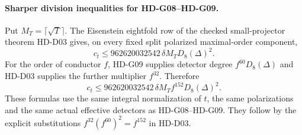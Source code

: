 \paragraph{Sharper division inequalities for HD-G08--HD-G09.}
Put $M_T=\lceil\sqrt T\rceil$. The Eisenstein eightfold row of
the checked small-projector theorem HD-D03 gives, on every fixed
split polarized maximal-order component,
\[
\boxed{c_t\le962620032542\,\delta M_T D_8(\Delta)^2.}
\]
For the order of conductor $f$, HD-G09 supplies detector degree
$f^{60}D_8(\Delta)$ and HD-D03 supplies the further multiplier
$f^{32}$. Therefore
\[
\boxed{c_t\le962620032542\,\delta M_T
f^{152}D_8(\Delta)^2.}
\]
These formulas use the same integral normalization of $t$, the same
polarizations and the same actual effective detectors as HD-G08--HD-G09.
They follow by the explicit substitutions
$f^{32}(f^{60})^2=f^{152}$ in HD-D03.
